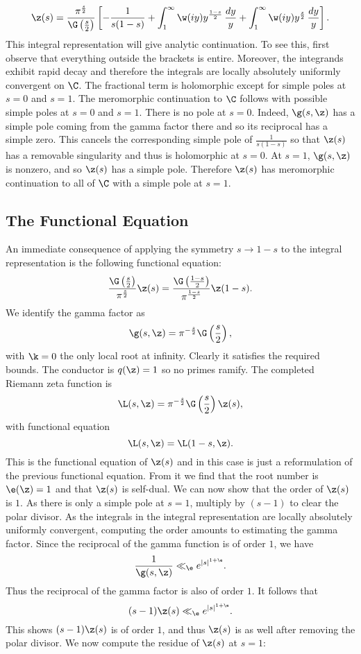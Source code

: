       \[
        \z(s) = \frac{\pi^{\frac{s}{2}}}{\G\left(\frac{s}{2}\right)}\left[-\frac{1}{s(1-s)}+\int_{1}^{\infty}\w(iy)y^{\frac{1-s}{2}}\,\frac{dy}{y}+\int_{1}^{\infty}\w(iy)y^{\frac{s}{2}}\,\frac{dy}{y}\right].
      \]
      This integral representation will give analytic continuation. To see this, first observe that everything outside the brackets is entire. Moreover, the integrands exhibit rapid decay and therefore the integrals are locally absolutely uniformly convergent on $\C$. The fractional term is holomorphic except for simple poles at $s = 0$ and $s = 1$. The meromorphic continuation to $\C$ follows with possible simple poles at $s = 0$ and $s = 1$. There is no pole at $s = 0$. Indeed, $\g(s,\z)$ has a simple pole coming from the gamma factor there and so its reciprocal has a simple zero. This cancels the corresponding simple pole of $\frac{1}{s(1-s)}$ so that $\z(s)$ has a removable singularity and thus is holomorphic at $s = 0$. At $s = 1$, $\g(s,\z)$ is nonzero, and so $\z(s)$ has a simple pole. Therefore $\z(s)$ has meromorphic continuation to all of $\C$ with a simple pole at $s = 1$. 
    \subsection*{The Functional Equation}
      An immediate consequence of applying the symmetry $s \to 1-s$ to the integral representation is the following functional equation:
      \[
        \frac{\G\left(\frac{s}{2}\right)}{\pi^{\frac{s}{2}}}\z(s) = \frac{\G\left(\frac{1-s}{2}\right)}{\pi^{\frac{1-s}{2}}}\z(1-s).
      \]
      We identify the gamma factor as
      \[
        \g(s,\z) = \pi^{-\frac{s}{2}}\G\left(\frac{s}{2}\right),
      \]
      with $\k = 0$ the only local root at infinity. Clearly it satisfies the required bounds. The conductor is $q(\z) = 1$ so no primes ramify. The completed Riemann zeta function is
      \[
        \L(s,\z) = \pi^{-\frac{s}{2}}\G\left(\frac{s}{2}\right)\z(s),
      \]
      with functional equation
      \[
        \L(s,\z) = \L(1-s,\z).
      \]
      This is the functional equation of $\z(s)$ and in this case is just a reformulation of the previous functional equation. From it we find that the root number is $\e(\z) = 1$ and that $\z(s)$ is self-dual. We can now show that the order of $\z(s)$ is $1$. As there is only a simple pole at $s = 1$, multiply by $(s-1)$ to clear the polar divisor. As the integrals in the integral representation are locally absolutely uniformly convergent, computing the order amounts to estimating the gamma factor. Since the reciprocal of the gamma function is of order $1$, we have
      \[
        \frac{1}{\g(s,\z)} \ll_{\e} e^{|s|^{1+\e}}.
      \]
      Thus the reciprocal of the gamma factor is also of order $1$. It follows that
      \[
        (s-1)\z(s) \ll_{\e} e^{|s|^{1+\e}}.
      \]
      This shows $(s-1)\z(s)$ is of order $1$, and thus $\z(s)$ is as well after removing the polar divisor. We now compute the residue of $\z(s)$ at $s = 1$:

